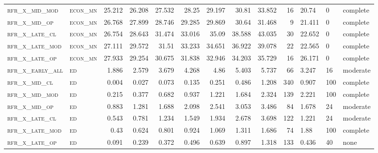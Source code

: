 \begin{landscape}
\begin{center}
\begin{footnotesize}
\begin{longtable}{llrrrrr|rrr}
\textsc{rfr\_x\_mid\_mod  } & \textsc{econ\_mn  }   & 25.212  & 26.208  & 27.532  & 28.25    & 29.197   & 30.81    & 33.852   & 16     & 20.74         & 0             & complete            \\
\textsc{rfr\_x\_mid\_op   } & \textsc{econ\_mn  }   & 26.768  & 27.899  & 28.746  & 29.285   & 29.869   & 30.64    & 31.468   & 9      & 21.411        & 0             & complete            \\
\textsc{rfr\_x\_late\_cl  } & \textsc{econ\_mn  }   & 26.754  & 28.643  & 31.474  & 33.016   & 35.09    & 38.588   & 43.035   & 30     & 22.652        & 0             & complete            \\
\textsc{rfr\_x\_late\_mod } & \textsc{econ\_mn  }   & 27.111  & 29.572  & 31.51   & 33.233   & 34.651   & 36.922   & 39.078   & 22     & 22.565        & 0             & complete            \\
\textsc{rfr\_x\_late\_op  } & \textsc{econ\_mn  }   & 27.933  & 29.254  & 30.675  & 31.838   & 32.946   & 34.203   & 35.729   & 16     & 26.171        & 0             & complete            \\
\textsc{rfr\_x\_early\_all} & \textsc{ed        }   & 1.886   & 2.579   & 3.679   & 4.268    & 4.86     & 5.403    & 5.737    & 66     & 3.247         & 16            & moderate        \\
\textsc{rfr\_x\_mid\_cl   } & \textsc{ed        }   & 0.004   & 0.027   & 0.073   & 0.135    & 0.251    & 0.486    & 1.208    & 340    & 0.907         & 100           & complete        \\
\textsc{rfr\_x\_mid\_mod  } & \textsc{ed        }   & 0.215   & 0.377   & 0.682   & 0.937    & 1.221    & 1.684    & 2.324    & 139    & 2.221         & 100           & complete        \\
\textsc{rfr\_x\_mid\_op   } & \textsc{ed        }   & 0.883   & 1.281   & 1.688   & 2.098    & 2.541    & 3.053    & 3.486    & 84     & 1.678         & 24            & moderate        \\
\textsc{rfr\_x\_late\_cl  } & \textsc{ed        }   & 0.543   & 0.781   & 1.234   & 1.549    & 1.934    & 2.678    & 3.698    & 122    & 1.221         & 24            & moderate        \\
\textsc{rfr\_x\_late\_mod } & \textsc{ed        }   & 0.43    & 0.624   & 0.801   & 0.924    & 1.069    & 1.311    & 1.686    & 74     & 1.88          & 100           & complete        \\
\textsc{rfr\_x\_late\_op  } & \textsc{ed        }   & 0.091   & 0.239   & 0.372   & 0.496    & 0.639    & 0.897    & 1.318    & 133    & 0.436         & 40            & none        \\

\end{longtable}
\end{footnotesize}
\end{center}
\end{landscape}
